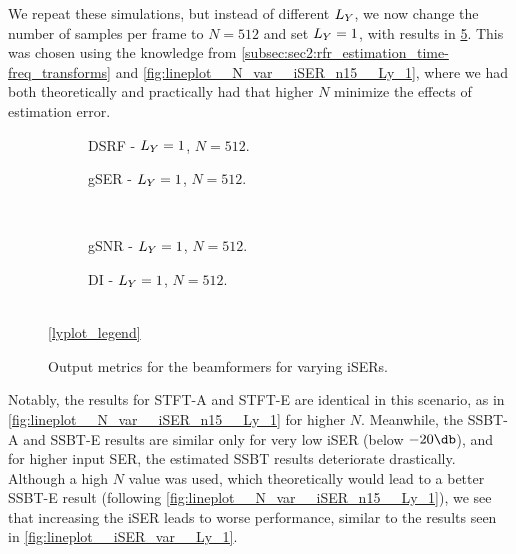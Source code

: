 We repeat these simulations, but instead of different $\Ly$, we now change the number of samples per frame to $N = 512$ and set $\Ly = 1$, with results in \cref{fig:lineplot__N_512__iSER_var__Ly_1}. This was chosen using the knowledge from \cref{subsec:sec2:rfr_estimation_time-freq_transforms} and \cref{fig:lineplot__N_var__iSER_n15__Ly_1}, where we had both theoretically and practically had that higher $N$ minimize the effects of estimation error.
\begin{figure}[!htp]
	\centering
	\begin{subfigure}{0.49\textwidth}
		\centering
		
		\caption{DSRF - $\Ly = 1$, $N = 512$.}
		\label{subfig:lineplot__DSRF__N_512__iSER_var__Ly_1}
	\end{subfigure}\hfill
	\begin{subfigure}{0.49\textwidth}
		\centering
		
		\caption{gSER - $\Ly = 1$, $N = 512$.}
		\label{subfig:lineplot__gSER__N_512__iSER_var__Ly_1}
	\end{subfigure}\\[1em]
	\begin{subfigure}{0.49\textwidth}
		\centering
		
		\caption{gSNR - $\Ly = 1$, $N = 512$.}
		\label{subfig:lineplot__gSNR__N_512__iSER_var__Ly_1}
	\end{subfigure}\hfill
	\begin{subfigure}{0.49\textwidth}
		\centering
		
		\caption{DI - $\Ly = 1$, $N = 512$.}
		\label{subfig:lineplot__DI__N_512__iSER_var__Ly_1}
	\end{subfigure}\\[1em]
	\ref*{lyplot_legend}
	\caption{Output metrics for the beamformers for varying iSERs.}
	\label{fig:lineplot__N_512__iSER_var__Ly_1}
\end{figure}
Notably, the results for STFT-A and STFT-E are identical in this scenario, as in \cref{fig:lineplot__N_var__iSER_n15__Ly_1} for higher $N$. Meanwhile, the SSBT-A and SSBT-E results are similar only for very low iSER (below $-20\dB$), and for higher input SER, the estimated SSBT results deteriorate drastically. Although a high $N$ value was used, which theoretically would lead to a better SSBT-E result (following \cref{fig:lineplot__N_var__iSER_n15__Ly_1}), we see that increasing the iSER leads to worse performance, similar to the results seen in \cref{fig:lineplot__iSER_var__Ly_1}.

